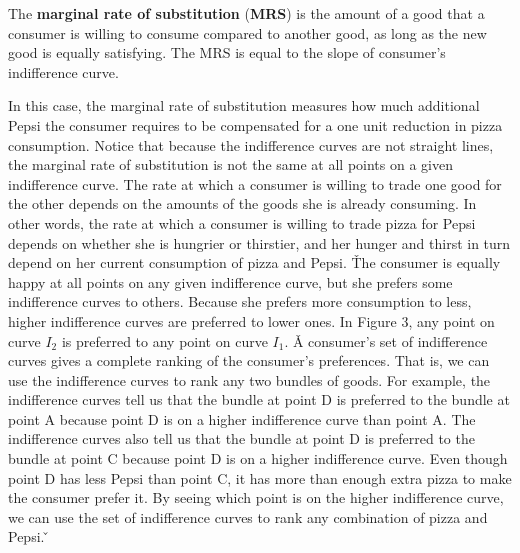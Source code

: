 
 The \textbf{marginal rate of substitution} (\textbf{MRS}) is the amount of a
good that a consumer is willing to consume compared to another good, as long as the new good is equally satisfying.
The MRS is equal to the slope of consumer's indifference curve. \ed

In this case, the marginal rate of substitution measures how much additional Pepsi the consumer requires to be
compensated for a one unit reduction in pizza consumption. Notice that because the indifference curves are not
straight lines, the marginal rate of substitution is not the same at all points on a given indifference curve. The
rate at which a consumer is willing to trade one good for the other depends on the amounts of the goods she is
already consuming. In other words, the rate at which a consumer is willing to trade pizza for Pepsi depends on
whether she is hungrier or thirstier, and her hunger and thirst in turn depend on her current consumption of pizza
and Pepsi. \v

The consumer is equally happy at all points on any given indifference curve, but she prefers some indifference curves
to others. Because she prefers more consumption to less, higher indifference curves are preferred to lower ones. In
Figure 3, any point on curve $I_2$ is preferred to any point on curve $I_1$. \v

A consumer's set of indifference curves gives a complete ranking of the consumer's preferences. That is, we can use
the indifference curves to rank any two bundles of goods. For example, the indifference curves tell us that the
bundle at point D is preferred to the bundle at point A because point D is on a higher indifference curve than point
A. The indifference curves also tell us that the bundle at point D is preferred to the bundle at point C because
point D is on a higher indifference curve. Even though point D has less Pepsi than point C, it has more than enough
extra pizza to make the consumer prefer it. By seeing which point is on the higher indifference curve, we can use the
set of indifference curves to rank any combination of pizza and Pepsi. \v

